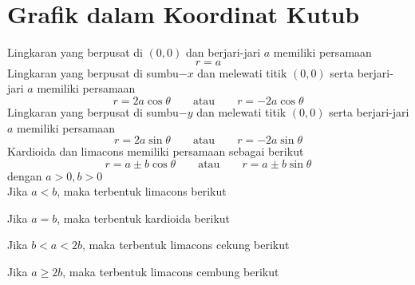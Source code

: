 \documentclass{article}
\begin{document}
\section{Grafik dalam Koordinat Kutub}
Lingkaran yang berpusat di $(0,0)$ dan berjari-jari $a$ memiliki persamaan
$$ r = a $$
Lingkaran yang berpusat di sumbu$-x$ dan melewati titik $(0,0)$ serta berjari-jari $a$ memiliki persamaan
$$ r=2a\cos\theta \qquad \text{atau} \qquad r=-2a\cos\theta $$
Lingkaran yang berpusat di sumbu$-y$ dan melewati titik $(0,0)$ serta berjari-jari $a$ memiliki persamaan
$$ r=2a\sin\theta \qquad \text{atau} \qquad r=-2a\sin\theta $$
Kardioida dan limacons memiliki persamaan sebagai berikut 
$$ r=a\pm b\cos\theta \qquad\text{atau}\qquad r=a\pm b \sin\theta $$
dengan $a>0,b>0$\\
Jika $a<b$, maka terbentuk limacons berikut
\begin{center}
	\end{center}
Jika $a=b$, maka terbentuk kardioida berikut
\begin{center}
	\end{center}
Jika $b<a<2b$, maka terbentuk limacons cekung berikut
\begin{center}
	\end{center}
Jika $a\geq 2b$, maka terbentuk limacons cembung berikut
\begin{center}
	\end{center} 
\end{document}
